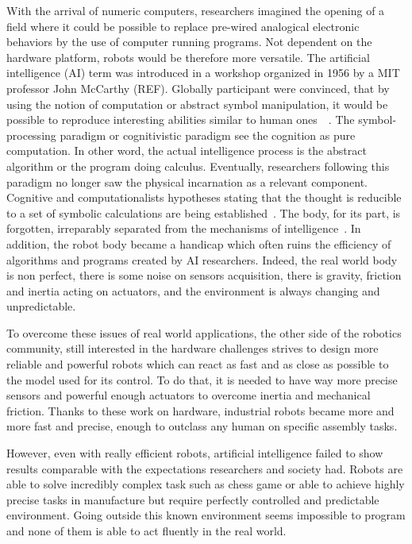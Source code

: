 With the arrival of numeric computers, researchers imagined the opening of a field where it could be possible to replace pre-wired analogical electronic behaviors by the use of computer running programs. Not dependent on the hardware platform, robots would be therefore more versatile.
The artificial intelligence (AI) term was introduced in a workshop organized in 1956 by a MIT professor John McCarthy (REF). Globally participant were convinced, that by using the notion of computation or abstract symbol manipulation, it would be possible to reproduce interesting abilities similar to human ones~\cite{kaufmann1979machines}~\cite{haugeland1989artificial}. The symbol-processing paradigm or cognitivistic paradigm see the cognition as pure computation. In other word, the actual intelligence process is the abstract algorithm or the program doing calculus. Eventually, researchers following this paradigm no longer saw the physical incarnation as a relevant component. Cognitive and computationalists hypotheses stating that the thought is reducible to a set of symbolic calculations are being established~\cite{fodor1987psychosemantics}. The body, for its part, is forgotten, irreparably separated from the mechanisms of intelligence~\cite{kaplan2008corps}.
In addition, the robot body became a handicap which often ruins the efficiency of algorithms and programs created by AI researchers. Indeed, the real world body is non perfect, there is some noise on sensors acquisition, there is gravity, friction and inertia acting on actuators, and the environment is always changing and unpredictable.

To overcome these issues of real world applications, the other side of the robotics community, still interested in the hardware challenges strives to design more reliable and powerful robots which can react as fast and as close as possible to the model used for its control. To do that, it is needed to have way more precise sensors and powerful enough actuators to overcome inertia and mechanical friction. Thanks to these work on hardware, industrial robots became more and more fast and precise, enough to outclass any human on specific assembly tasks.

However, even with really efficient robots, artificial intelligence failed to show results comparable with the expectations researchers and society had. Robots are able to solve incredibly complex task such as chess game or able to achieve highly precise tasks in manufacture but require perfectly controlled and predictable environment. Going outside this known environment seems impossible to program and none of them is able to act fluently in the real world.

